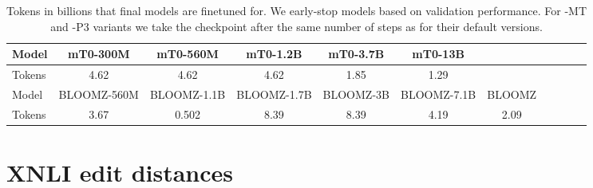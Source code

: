 \documentclass[11pt]{article}
\begin{document}
\begin{table}[h]
    \small
    \begin{center}
\begin{tabular}{l|cccccccccc}
\toprule
Model & mT0-300M & mT0-560M & mT0-1.2B & mT0-3.7B & mT0-13B \\
\midrule
Tokens & 4.62 & 4.62 & 4.62 & 1.85 & 1.29 \\
\midrule
Model & BLOOMZ-560M & BLOOMZ-1.1B & BLOOMZ-1.7B & BLOOMZ-3B & BLOOMZ-7.1B & BLOOMZ \\
\midrule
Tokens & 3.67 & 0.502 & 8.39 & 8.39 & 4.19 & 2.09 \\
\bottomrule
            \end{tabular}
\caption{Tokens in billions that final models are finetuned for. We early-stop models based on validation performance. For -MT and -P3 variants we take the checkpoint after the same number of steps as for their default versions.}
    \label{tab:earlystopping}
    \end{center}
\end{table}


\FloatBarrier

\section{XNLI edit distances}
\label{sec:levenshtein}

\begin{table}[h]
    \small
    \begin{center}
    \caption{Three samples from the English XNLI split. To solve XNLI models need to classify whether the premise entails, is neutral to or contradicts the hypothesis. Samples are cherry-picked.}
    \label{tab:xnliex}
    \end{center}
\end{table}
\end{document}
